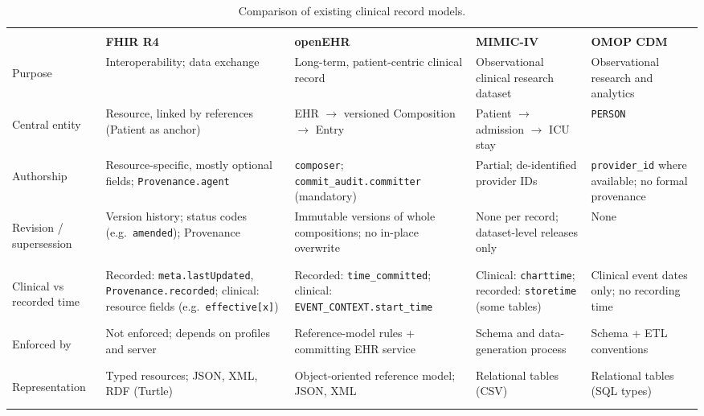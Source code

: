 \documentclass[sigconf]{acmart}
\begin{document}
\begin{table}[t]
\footnotesize
\setlength{\tabcolsep}{4pt}
\caption{Comparison of existing clinical record models.}
\label{tab:comparison}
\vspace{-1em}
\begin{tabularx}{\textwidth}{@{}>{\bfseries\raggedright\arraybackslash}p{2.3cm}*{4}{>{\raggedright\arraybackslash}X}@{}}
\toprule
 & \multicolumn{2}{c}{\textit{Operational / exchange}} & \multicolumn{2}{c}{\textit{Research / analytical}} \\
\cmidrule(lr){2-3}\cmidrule(l){4-5}
 & \textbf{FHIR R4}~\cite{fhir-r4} & \textbf{openEHR}~\cite{openehr-rm} & \textbf{MIMIC-IV}~\cite{mimic-iv} & \textbf{OMOP CDM}~\cite{omop-cdm} \\
\midrule
Purpose &
  Interoperability; data exchange &
  Long-term, patient-centric clinical record &
  Observational clinical research dataset &
  Observational research and analytics \\
\addlinespace
Central entity &
  Resource, linked by references (Patient as anchor) &
  EHR $\rightarrow$ versioned Composition $\rightarrow$ Entry &
  Patient $\rightarrow$ admission $\rightarrow$ ICU stay &
  \texttt{PERSON} \\
\addlinespace
Authorship &
  Resource-specific, mostly optional fields; \texttt{Provenance.agent} &
  \texttt{composer}; \texttt{commit\_audit.committer} (mandatory) &
  Partial; de-identified provider IDs &
  \texttt{provider\_id} where available; no formal provenance \\
\addlinespace
Revision / supersession &
  Version history; status codes (e.g.\ \texttt{amended}); Provenance &
  Immutable versions of whole compositions; no in-place overwrite &
  None per record; dataset-level releases only &
  None \\
\addlinespace
Clinical vs recorded time &
  Recorded: \texttt{meta.lastUpdated}, \texttt{Provenance.recorded}; clinical: resource fields (e.g.\ \texttt{effective[x]}) &
  Recorded: \texttt{time\_committed}; clinical: \texttt{EVENT\_CONTEXT.start\_time} &
  Clinical: \texttt{charttime}; recorded: \texttt{storetime} (some tables) &
  Clinical event dates only; no recording time \\
\addlinespace
Enforced by &
  Not enforced; depends on profiles and server &
  Reference-model rules + committing EHR service &
  Schema and data-generation process &
  Schema + ETL conventions \\
\addlinespace
Representation &
  Typed resources; JSON, XML, RDF (Turtle) &
  Object-oriented reference model; JSON, XML &
  Relational tables (CSV) &
  Relational tables (SQL types) \\
\bottomrule
\end{tabularx}
\vspace{-1em}
\end{table}
\end{document}
